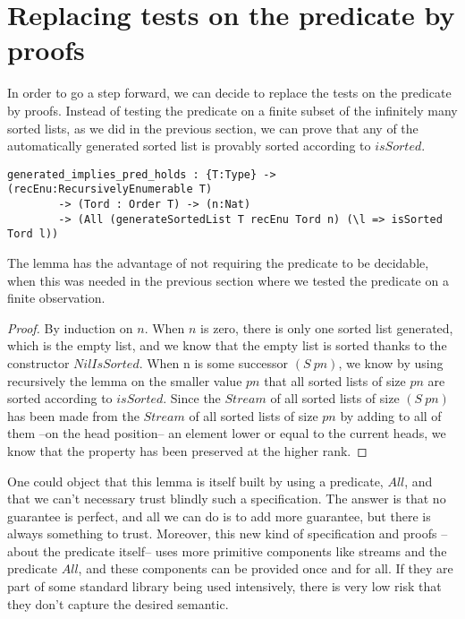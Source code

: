 \section{Replacing tests on the predicate by proofs}

\label{sect:aStepForward}

In order to go a step forward, we can decide to replace the tests on the predicate by proofs. Instead of testing the predicate on a finite subset of the infinitely many sorted lists, as we did in the previous section, we can prove that any of the automatically generated sorted list is provably sorted according to $isSorted$.

\begin{lstlisting}
generated_implies_pred_holds : {T:Type} -> (recEnu:RecursivelyEnumerable T) 
        -> (Tord : Order T) -> (n:Nat) 
        -> (All (generateSortedList T recEnu Tord n) (\l => isSorted Tord l))
\end{lstlisting}

The lemma has the advantage of not requiring the predicate to be decidable, when this was needed in the previous section where we tested the predicate on a finite observation.

\begin{proof}
By induction on $n$.
When $n$ is zero, there is only one sorted list generated, which is the empty list, and we know that the empty list is sorted thanks to the constructor $NilIsSorted$. When n is some successor $(S\ pn)$, we know by using recursively the lemma on the smaller value $pn$ that all sorted lists of size $pn$ are sorted according to $isSorted$. Since the $Stream$ of all sorted lists of size $(S\ pn)$ has been made from the $Stream$ of all sorted lists of size $pn$ by adding to all of them --on the head position-- an element lower or equal to the current heads, we know that the property has been preserved at the higher rank.
\end{proof}

One could object that this lemma is itself built by using a predicate, $All$, and that we can't necessary trust blindly such a specification. The answer is that no guarantee is perfect, and all we can do is to add more guarantee, but there is always something to trust. Moreover, this new kind of specification and proofs --about the predicate itself-- uses more primitive components like streams and the predicate $All$, and these components can be provided once and for all. If they are part of some standard library being used intensively, there is very low risk that they don't capture the desired semantic.

